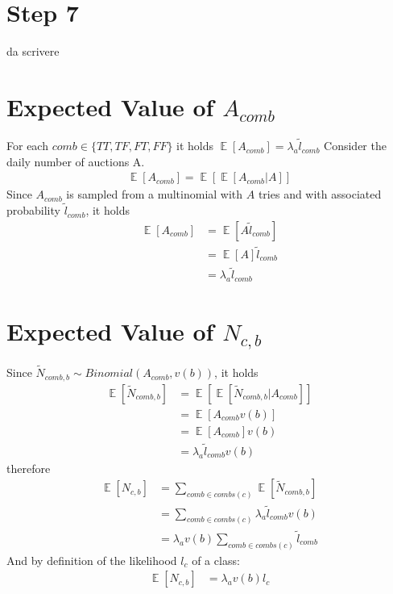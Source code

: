\documentclass[11pt]{article} %
\DeclareMathOperator{\EX}{\mathbb{E}}
\begin{document}
\clearpage
\section{Step 7}
{\color{red}da scrivere}


\appendix

\section{Expected Value of $A_{comb}$}\label{sec.acombproof}
For each $comb \in \{TT,TF,FT,FF\}$ it holds $\EX[A_{comb}] = \lambda_a \tilde{l}_{comb}$
\newline
\newline
Consider the daily number of auctions A.
\begin{align*}
\EX\left[A_{comb}\right] = \EX\left[\EX\left[A_{comb}|A\right]\right]
\end{align*}
Since $A_{comb}$ is sampled from a multinomial with $A$ tries and with associated probability $\tilde{l}_{comb}$, it holds
\begin{align*}
\EX\left[A_{comb}\right] &= \EX\left[A\tilde{l}_{comb}\right]\\
&= \EX\left[A\right]\tilde{l}_{comb}\\
&= \lambda_a\tilde{l}_{comb}
\end{align*}

\section{Expected Value of $N_{c,b}$}\label{sec.ncbproof}
Since $\tilde{N}_{comb,b} \sim Binomial(A_{comb}, v(b))$, it holds
\begin{align*}
\EX\left[\tilde{N}_{comb,b}\right] &= \EX\left[\EX\left[\tilde{N}_{comb,b}| A_{comb}\right]\right]\\
 &= \EX\left[A_{comb}v(b)\right]\\
 &= \EX\left[A_{comb}\right]v(b)\\
&= \lambda_a\tilde{l}_{comb}v(b)
\end{align*}
therefore
\begin{align*}
\EX\left[N_{c,b}\right] &= \sum_{comb \in combs(c)}{\EX\left[\tilde{N}_{comb,b}\right]}\\
&= \sum_{comb \in combs(c)}{\lambda_a\tilde{l}_{comb}v(b)}\\
&= \lambda_av(b)\sum_{comb \in combs(c)}{\tilde{l}_{comb}}
\end{align*}
And by definition of the likelihood $l_c$ of a class:
\begin{align*}
\EX\left[N_{c,b}\right]&= \lambda_av(b)l_c
\end{align*}
\end{document}
